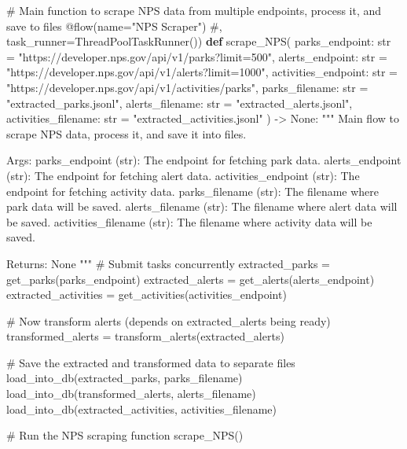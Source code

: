 \documentclass[
  letterpaper,
  DIV=11,
  numbers=noendperiod]{scrartcl}
\newenvironment{Shaded}{\begin{snugshade}}{\end{snugshade}}
\newcommand{\AttributeTok}[1]{\textcolor[rgb]{0.40,0.45,0.13}{#1}}
\newcommand{\BuiltInTok}[1]{\textcolor[rgb]{0.00,0.23,0.31}{#1}}
\newcommand{\CommentTok}[1]{\textcolor[rgb]{0.37,0.37,0.37}{#1}}
\newcommand{\KeywordTok}[1]{\textcolor[rgb]{0.00,0.23,0.31}{\textbf{#1}}}
\newcommand{\NormalTok}[1]{\textcolor[rgb]{0.00,0.23,0.31}{#1}}
\newcommand{\OperatorTok}[1]{\textcolor[rgb]{0.37,0.37,0.37}{#1}}
\newcommand{\StringTok}[1]{\textcolor[rgb]{0.13,0.47,0.30}{#1}}
\newcommand{\VariableTok}[1]{\textcolor[rgb]{0.07,0.07,0.07}{#1}}
\begin{document}
\begin{Shaded}
\begin{Highlighting}[]
\CommentTok{\# Main function to scrape NPS data from multiple endpoints, process it, and save to files}
\AttributeTok{@flow}\NormalTok{(name}\OperatorTok{=}\StringTok{"NPS Scraper"}\NormalTok{) }\CommentTok{\#, task\_runner=ThreadPoolTaskRunner())}
\KeywordTok{def}\NormalTok{ scrape\_NPS(}
\NormalTok{    parks\_endpoint: }\BuiltInTok{str} \OperatorTok{=} \StringTok{"https://developer.nps.gov/api/v1/parks?limit=500"}\NormalTok{,}
\NormalTok{    alerts\_endpoint: }\BuiltInTok{str} \OperatorTok{=} \StringTok{"https://developer.nps.gov/api/v1/alerts?limit=1000"}\NormalTok{,}
\NormalTok{    activities\_endpoint: }\BuiltInTok{str} \OperatorTok{=} \StringTok{"https://developer.nps.gov/api/v1/activities/parks"}\NormalTok{,}
\NormalTok{    parks\_filename: }\BuiltInTok{str} \OperatorTok{=} \StringTok{"extracted\_parks.jsonl"}\NormalTok{,}
\NormalTok{    alerts\_filename: }\BuiltInTok{str} \OperatorTok{=} \StringTok{"extracted\_alerts.jsonl"}\NormalTok{,}
\NormalTok{    activities\_filename: }\BuiltInTok{str} \OperatorTok{=} \StringTok{"extracted\_activities.jsonl"}
\NormalTok{) }\OperatorTok{{-}\textgreater{}} \VariableTok{None}\NormalTok{:}
    \CommentTok{"""}
\CommentTok{    Main flow to scrape NPS data, process it, and save it into files.}

\CommentTok{    Args:}
\CommentTok{        parks\_endpoint (str): The endpoint for fetching park data.}
\CommentTok{        alerts\_endpoint (str): The endpoint for fetching alert data.}
\CommentTok{        activities\_endpoint (str): The endpoint for fetching activity data.}
\CommentTok{        parks\_filename (str): The filename where park data will be saved.}
\CommentTok{        alerts\_filename (str): The filename where alert data will be saved.}
\CommentTok{        activities\_filename (str): The filename where activity data will be saved.}

\CommentTok{    Returns:}
\CommentTok{        None}
\CommentTok{    """}
    \CommentTok{\# Submit tasks concurrently}
\NormalTok{    extracted\_parks }\OperatorTok{=}\NormalTok{ get\_parks(parks\_endpoint)}
\NormalTok{    extracted\_alerts }\OperatorTok{=}\NormalTok{ get\_alerts(alerts\_endpoint)}
\NormalTok{    extracted\_activities }\OperatorTok{=}\NormalTok{ get\_activities(activities\_endpoint)}

    \CommentTok{\# Now transform alerts (depends on extracted\_alerts being ready)}
\NormalTok{    transformed\_alerts }\OperatorTok{=}\NormalTok{ transform\_alerts(extracted\_alerts)}

    \CommentTok{\# Save the extracted and transformed data to separate files}
\NormalTok{    load\_into\_db(extracted\_parks, parks\_filename)}
\NormalTok{    load\_into\_db(transformed\_alerts, alerts\_filename)}
\NormalTok{    load\_into\_db(extracted\_activities, activities\_filename)}

\CommentTok{\# Run the NPS scraping function}
\NormalTok{scrape\_NPS()}
\end{Highlighting}
\end{Shaded}
\end{document}
